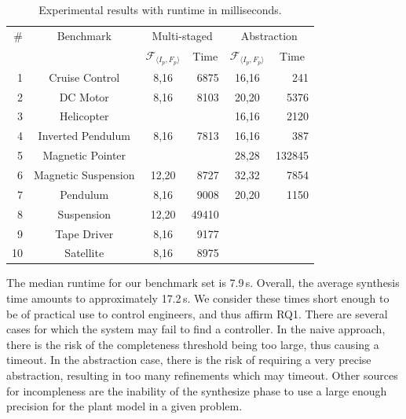 \documentclass[runningheads,a4paper]{llncs}
\newcommand{\xmark}{\ding{55}}
\begin{document}
\begin{table}
\centering
\scriptsize
\begin{tabular}{| r | c | c | r | c | r |}
\hline
\# & Benchmark  & \multicolumn{2}{|c|}{Multi-staged}                 & \multicolumn{2}{|c|}{Abstraction} \\
   &            & \multicolumn{1}{|c|}{$\mathcal{F}_{\langle I_p,F_p \rangle}$} & \multicolumn{1}{|c|}{Time} & \multicolumn{1}{|c|}{$\mathcal{F}_{\langle I_p,F_p \rangle}$} & \multicolumn{1}{|c|}{Time} \\\hline
1  & Cruise Control      & 8,16   & 6875   & 16,16  & 241    \\
2  & DC Motor            & 8,16   & 8103   & 20,20  & 5376   \\
3  & Helicopter          & \xmark & \xmark & 16,16  & 2120   \\
4  & Inverted Pendulum   & 8,16   & 7813   & 16,16  & 387    \\
5  & Magnetic Pointer    & \xmark & \xmark & 28,28  & 132845 \\
6  & Magnetic Suspension & 12,20  & 8727   & 32,32  & 7854   \\
7  & Pendulum            & 8,16   & 9008   & 20,20  & 1150   \\
8  & Suspension          & 12,20  & 49410  & \xmark & \xmark \\
9  & Tape Driver         & 8,16   & 9177   & \xmark & \xmark \\
10 & Satellite           & 8,16   & 8975   & \xmark & \xmark \\\hline

\end{tabular}
\caption{Experimental results with runtime in milliseconds. \label{tab:results}}
\end{table}

The median runtime for our benchmark set is 7.9\,s.  Overall,
the average synthesis time amounts to approximately 17.2\,s.  We
consider these times short enough to be of practical use to control
engineers, and thus affirm RQ1.  
There are several cases for which the system may fail to find a controller. In the naive approach,
there is the risk of the completeness threshold being too large, thus causing a timeout.
In the abstraction case, there is the risk of requiring a very precise abstraction, resulting in too many refinements which may timeout.
Other sources for incompleness are the inability of the {\sc synthesize} phase to use a large enough precision for the plant model in a given problem.
\end{document}
